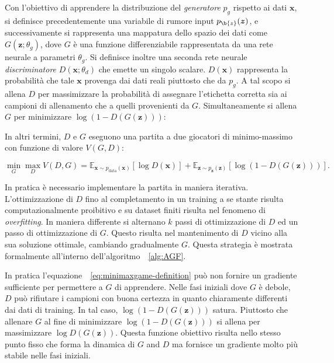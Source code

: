 Con l'obiettivo di apprendere la distribuzione del \textit{generatore} $p_g$ rispetto ai dati $\bm{x}$, si definisce precedentemente una variabile di rumore input  $p_{\b{z}}(\bm{z})$, e successivamente si rappresenta una mappatura dello spazio dei dati come $G(\bm{z}; \theta_g)$, dove $G$ è una funzione differenziabile rappresentata da una rete neurale a parametri $\theta_g$. Si definisce inoltre una seconda rete neurale \textit{discriminatore}
 $D(\bm{x}; \theta_d)$ che emette un singolo scalare. $D(\bm{x})$ rappresenta la probabilità che tale $\bm{x}$ provenga dai dati reali piuttosto che da $p_g$. 
A tal scopo si allena $D$ per massimizzare la probabilità di assegnare l'etichetta corretta sia ai campioni di allenamento che a quelli provenienti da $G$.
Simultaneamente si allena $G$ per minimizzare $\log(1-D(G(\bm{z})))$:

In altri termini, $D$ e $G$ eseguono una partita a due giocatori di minimo-massimo con funzione di valore $V(G, D)$: 

\begin{equation}
\label{eq:minimaxgame-definition}
\min_G \max_D V(D, G) = \mathbb{E}_{\bm{x} \sim p_{\text{data}}(\bm{x})}[\log D(\bm{x})] + \mathbb{E}_{\bm{z} \sim p_{\bm{z}}(\bm{z})}[\log (1 - D(G(\bm{z})))].
\end{equation}

In pratica è necessario implementare la partita in maniera iterativa. L'ottimizzazione di $D$ fino al completamento in un training a se stante risulta computazionalmente proibitivo e su dataset finiti risulta nel fenomeno di \textit{overfitting}. In maniera differente si alternano $k$ passi di ottimizzazione di $D$ ed un passo di ottimizzazione di $G$. Questo risulta nel mantenimento di $D$ vicino alla sua soluzione ottimale, cambiando gradualmente $G$. Questa strategia è mostrata formalmente all'interno dell'algoritmo~~\ref{alg:AGF}.

In pratica l'equazione~~\ref{eq:minimaxgame-definition} può non fornire un gradiente sufficiente per permettere a $G$ di apprendere. Nelle fasi iniziali dove $G$ è debole, $D$ può rifiutare i campioni con buona certezza in quanto chiaramente differenti dai dati di training. In tal caso, $\log ( 1- D(G(\bm{z})))$ satura. Piuttosto che allenare $G$ al fine di minimizzare $\log (1 - D(G(\bm{z})))$ si allena per massimizzare $\log D(G(\bm{z}))$. 
Questa funzione obiettivo risulta nello stesso punto fisso che forma la dinamica di $G$ and $D$ ma fornisce un gradiente molto più stabile nelle fasi iniziali.

